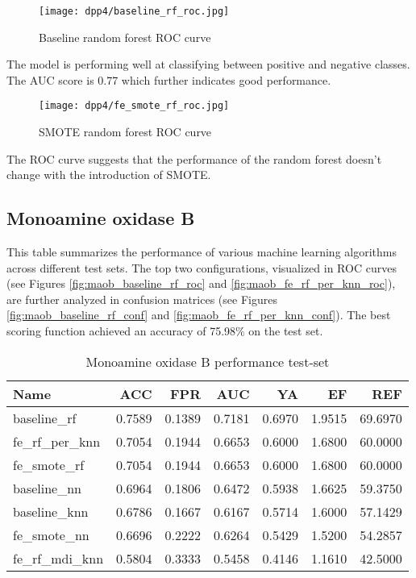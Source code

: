 \begin{figure}[H]
    \begin{center}
        \caption[]{Baseline random forest ROC curve}
        \label{fig:dpp4_baseline_rf_roc}
        \texttt{[image: dpp4/baseline\_rf\_roc.jpg]}
    \end{center}
\end{figure}
The model is performing well at classifying between positive and negative classes. The AUC score is 0.77 which further indicates good performance.

\begin{figure}[H]
    \begin{center}
        \caption[]{SMOTE random forest ROC curve}
        \label{fig:dpp4_smote_rf_roc}
        \texttt{[image: dpp4/fe\_smote\_rf\_roc.jpg]}
    \end{center}
\end{figure}
The ROC curve suggests that the performance of the random forest doesn't change with the introduction of SMOTE.

\subsection{Monoamine oxidase B}
This table summarizes the performance of various machine learning algorithms across different test sets.
The top two configurations, visualized in ROC curves (see Figures \ref{fig:maob_baseline_rf_roc} and \ref{fig:maob_fe_rf_per_knn_roc}),
are further analyzed in confusion matrices (see Figures \ref{fig:maob_baseline_rf_conf} and \ref{fig:maob_fe_rf_per_knn_conf}).
The best scoring function achieved an accuracy of 75.98\% on the test set.

\begin{table}[H]
    \begin{center}
        \caption{Monoamine oxidase B performance test-set}
        \begin{tabular}{lrrrrrr}
            \toprule
            Name             & ACC    & FPR    & AUC    & YA     & EF     & REF     \\
            \midrule
            baseline\_rf     & 0.7589 & 0.1389 & 0.7181 & 0.6970 & 1.9515 & 69.6970 \\
            fe\_rf\_per\_knn & 0.7054 & 0.1944 & 0.6653 & 0.6000 & 1.6800 & 60.0000 \\
            fe\_smote\_rf    & 0.7054 & 0.1944 & 0.6653 & 0.6000 & 1.6800 & 60.0000 \\
            baseline\_nn     & 0.6964 & 0.1806 & 0.6472 & 0.5938 & 1.6625 & 59.3750 \\
            baseline\_knn    & 0.6786 & 0.1667 & 0.6167 & 0.5714 & 1.6000 & 57.1429 \\
            fe\_smote\_nn    & 0.6696 & 0.2222 & 0.6264 & 0.5429 & 1.5200 & 54.2857 \\
            fe\_rf\_mdi\_knn & 0.5804 & 0.3333 & 0.5458 & 0.4146 & 1.1610 & 42.5000 \\
            \bottomrule
        \end{tabular}
    \end{center}
\end{table}


